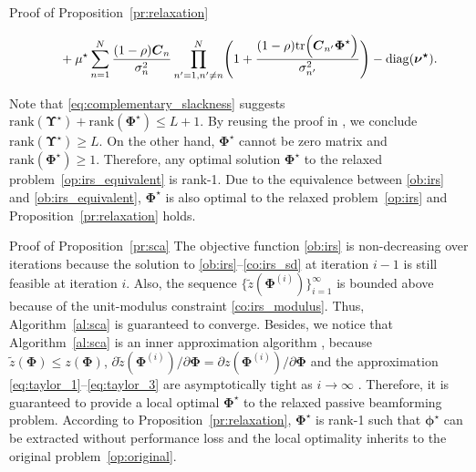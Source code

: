 \documentclass[journal]{IEEEtran}
\begin{document}
\begin{appendix}
\begin{subsection}{Proof of Proposition~\ref{pr:relaxation}}
\begin{figure*}[!b]
\begin{align}
					& \quad + \mu^\star \sum_{n=1}^N \frac{(1-\rho) \boldsymbol{C}_n}{\sigma_n^2} \prod_{n'=1,n' \ne n}^N \Biggl(
						1 + \frac{(1-\rho)\mathrm{tr}\Bigl(
							\boldsymbol{C}_{n'} \boldsymbol{\Phi}^\star
						\Bigr)}{\sigma_{n'}^2}
					\Biggr) - \mathrm{diag}(\boldsymbol{\nu^\star}).
				\end{align}
			\end{figure*}
			Note that \eqref{eq:complementary_slackness} suggests $\mathrm{rank}(\boldsymbol{\Upsilon}^\star)+\mathrm{rank}(\boldsymbol{\Phi}^\star) \le L+1$. By reusing the proof in \cite[Appendix~A]{Xu2020}, we conclude $\mathrm{rank}(\boldsymbol{\Upsilon}^\star) \ge L$. On the other hand, $\boldsymbol{\Phi}^\star$ cannot be zero matrix and $\mathrm{rank}(\boldsymbol{\Phi}^\star) \ge 1$. Therefore, any optimal solution $\boldsymbol{\Phi}^\star$ to the relaxed problem~\eqref{op:irs_equivalent} is rank-\num{1}. Due to the equivalence between \eqref{ob:irs} and \eqref{ob:irs_equivalent}, $\boldsymbol{\Phi}^\star$ is also optimal to the relaxed problem~\eqref{op:irs} and Proposition~\ref{pr:relaxation} holds.
		\end{subsection}

		\begin{subsection}{Proof of Proposition~\ref{pr:sca}}\label{ap:sca}
			The objective function \eqref{ob:irs} is non-decreasing over iterations because the solution to \eqref{ob:irs}--\eqref{co:irs_sd} at iteration $i-1$ is still feasible at iteration $i$. Also, the sequence $\{\tilde{z}(\boldsymbol{\Phi}^{(i)})\}_{i=1}^{\infty}$ is bounded above because of the unit-modulus constraint \eqref{co:irs_modulus}. Thus, Algorithm~\ref{al:sca} is guaranteed to converge. Besides, we notice that Algorithm~\ref{al:sca} is an inner approximation algorithm \cite{Marks1978}, because $\tilde{z}(\boldsymbol{\Phi}) \le z(\boldsymbol{\Phi})$, $\partial\tilde{z}(\boldsymbol{\Phi}^{(i)})/\partial\boldsymbol{\Phi}=\partial z(\boldsymbol{\Phi}^{(i)})/\partial\boldsymbol{\Phi}$ and the approximation \eqref{eq:taylor_1}--\eqref{eq:taylor_3} are asymptotically tight as $i \to \infty$ \cite{Li2013}. Therefore, it is guaranteed to provide a local optimal $\boldsymbol{\Phi}^{\star}$ to the relaxed passive beamforming problem. According to Proposition~\ref{pr:relaxation}, $\boldsymbol{\Phi}^{\star}$ is rank-\num{1} such that $\boldsymbol{\phi}^{\star}$ can be extracted without performance loss and the local optimality inherits to the original problem~\eqref{op:original}.
		\end{subsection}


\end{appendix}
\end{document}

